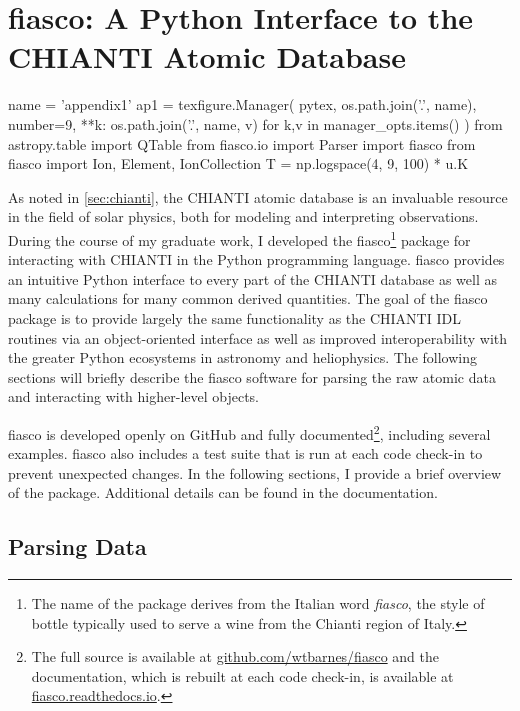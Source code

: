 \chapter{fiasco: A Python Interface to the CHIANTI Atomic Database}\label{ap:fiasco}

\begin{pycode}[appendix1]
name = 'appendix1'
ap1 = texfigure.Manager(
    pytex,
    os.path.join('.', name),
    number=9,
    **{k: os.path.join('.', name, v) for k,v in manager_opts.items()}
)
from astropy.table import QTable
from fiasco.io import Parser
import fiasco
from fiasco import Ion, Element, IonCollection
T = np.logspace(4, 9, 100) * u.K
\end{pycode}

As noted in \autoref{sec:chianti}, the CHIANTI atomic database is an invaluable resource in the field of solar physics, both for modeling and interpreting observations. During the course of my graduate work, I developed the fiasco\footnote{The name of the package derives from the Italian word \textit{fiasco}, the style of bottle typically used to serve a wine from the Chianti region of Italy.} package for interacting with CHIANTI in the Python programming language. fiasco provides an intuitive Python interface to every part of the CHIANTI database as well as many calculations for many common derived quantities. The goal of the fiasco package is to provide largely the same functionality as the CHIANTI IDL routines via an object-oriented interface \citep[similar to ChiantiPy][]{landi_chiantiatomic_2012,barnes_chiantipy_2017} as well as improved interoperability with the greater Python ecosystems in astronomy and heliophysics. The following sections will briefly describe the fiasco software for parsing the raw atomic data and interacting with higher-level objects.

fiasco is developed openly on GitHub and fully documented\footnote{The full source is available at \href{https://github.com/wtbarnes/fiasco}{github.com/wtbarnes/fiasco} and the documentation, which is rebuilt at each code check-in, is available at \href{https://fiasco.readthedocs.io/en/latest/}{fiasco.readthedocs.io}.}, including several examples. fiasco also includes a test suite that is run at each code check-in to prevent unexpected changes. In the following sections, I provide a brief overview of the package. Additional details can be found in the documentation.  

\section{Parsing Data}\label{sec:parsing-chianti}

